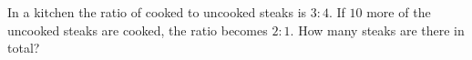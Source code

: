 In a kitchen the ratio of cooked to uncooked steaks is $3:4$. If $10$ more of the uncooked steaks are cooked, the ratio becomes $2:1$. How many steaks are there in total?
